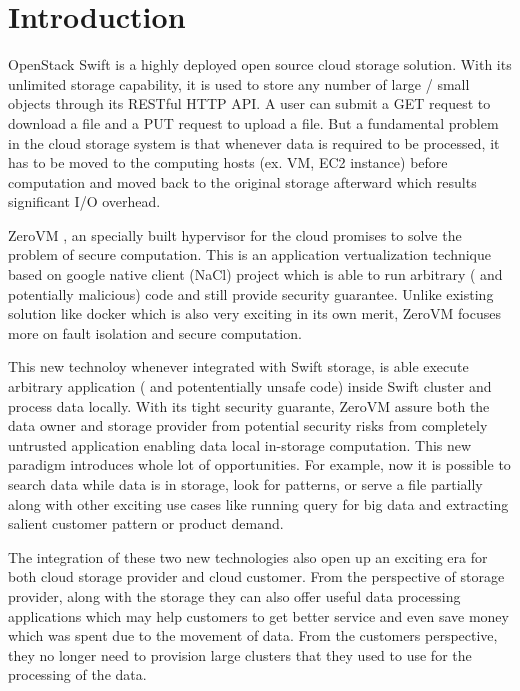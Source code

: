 \section{Introduction}
OpenStack  Swift is a highly deployed open source cloud storage solution. With its unlimited storage capability, it is used to store any number of large / small objects through its  RESTful HTTP API. A user can  submit a GET request to download a  file and a PUT request to upload a file. But a fundamental problem in the cloud storage system is  that whenever data is required to be processed, it has to be moved to the computing hosts (ex. VM, EC2 instance) before computation and moved back to the original storage afterward which  results significant I/O overhead. 



ZeroVM \cite{zerovm}, an specially built hypervisor for the cloud promises to solve the problem of secure computation. This is an application vertualization technique based on google native client (NaCl) project \cite{nacl} which is able to run arbitrary ( and potentially malicious) code  and still provide security guarantee. Unlike existing solution like docker \cite{docker} which is also very exciting in its own merit, ZeroVM focuses more on fault isolation and secure computation. 


This new technoloy whenever integrated with  Swift storage, is able execute arbitrary application ( and potententially unsafe code) inside Swift cluster and process data locally. With its tight security guarante, ZeroVM assure both the data owner and storage provider  from potential security risks from completely untrusted application enabling data local in-storage computation. This new paradigm introduces whole lot of opportunities. For example, now it is possible to search data while data is in storage, look for patterns, or serve a file partially along with other exciting use cases like  running query for big data and  extracting salient customer pattern or product demand. 

The integration of these two new technologies also open up an exciting era for both cloud storage provider and cloud customer. From the perspective of storage provider, along with the storage they can also offer useful data processing applications  which may help customers to get better service and even save money which was spent due to the movement of data. From the customers perspective, they no longer need to provision large clusters that they used to use for the processing of the data.  

